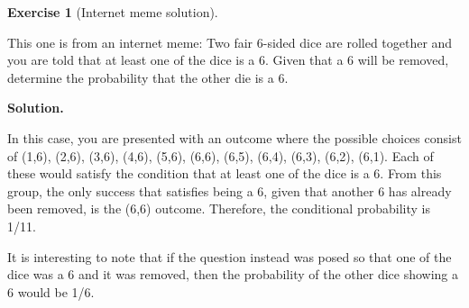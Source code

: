 \documentclass[10pt,]{book}
\theoremstyle{plain}
\theoremstyle{definition}
\theoremstyle{definition}
\theoremstyle{definition}
\newtheorem{exercise}[theorem]{Exercise}
\numberwithin{equation}{section}
\begin{document}
\begin{exercise}[{Internet meme solution}]\label{exercise-27}

	This one is from an internet meme:  Two fair 6-sided dice are rolled together and you are told that at least one of the dice is a 6. Given that a 6 will be removed, determine the probability that the other die is a 6.
\par\smallskip
\noindent\textbf{Solution.}\hypertarget{solution-6}{}\quad

	In this case, you are presented with an outcome where the possible choices consist of (1,6), (2,6), (3,6), (4,6), (5,6), (6,6), (6,5), (6,4), (6,3), (6,2), (6,1).  Each of these would satisfy the condition that at least one of the dice is a 6. From this group, the only success that satisfies being a 6, given that another 6 has already been removed, is the (6,6) outcome. Therefore, the conditional probability is 1/11.
\par

	It is interesting to note that if the question instead was posed so that one of the dice was a 6 and it was removed, then the probability of the other dice showing a 6 would be 1/6.
\end{exercise}
\end{document}
